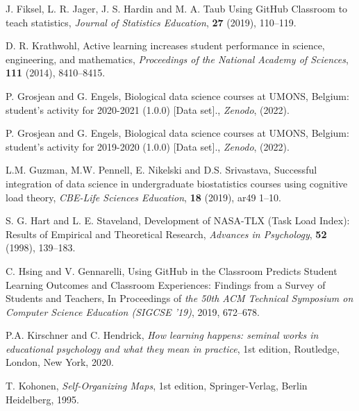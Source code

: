 \documentclass{aims} %
\theoremstyle{definition}
\begin{document}
\begin{thebibliography}{99}
     \newblock J. Fiksel, L. R. Jager, J. S. Hardin and M. A. Taub
     \newblock Using GitHub Classroom to teach statistics,
     \newblock \emph{Journal of Statistics Education}, \textbf{27} (2019), 110--119.

     \newblock  D. R. Krathwohl,
     \newblock Active learning increases student performance in science, engineering, and mathematics,
     \newblock \emph{Proceedings of the National Academy of Sciences}, \textbf{111} (2014), 8410--8415.

     \newblock P. Grosjean and G. Engels,
     \newblock Biological data science courses at UMONS, Belgium: student's activity for 2020-2021 (1.0.0) [Data set].,
     \newblock \emph{Zenodo}, (2022).

     \newblock P. Grosjean and G. Engels,
     \newblock Biological data science courses at UMONS, Belgium: student's activity for 2019-2020 (1.0.0) [Data set].,
     \newblock \emph{Zenodo}, (2022).

     \newblock L.M. Guzman, M.W. Pennell, E. Nikelski and D.S. Srivastava,
     \newblock Successful integration of data science in undergraduate biostatistics courses using cognitive load theory,
     \newblock \emph{CBE-Life Sciences Education}, \textbf{18} (2019), ar49 1--10.

     \newblock S. G. Hart and L. E. Staveland,
     \newblock Development of NASA-TLX (Task Load Index): Results of Empirical and Theoretical Research,
     \newblock \emph{Advances in Psychology}, \textbf{52} (1998), 139--183.

     \newblock C. Hsing and V. Gennarelli,
     \newblock Using GitHub in the Classroom Predicts Student Learning Outcomes and Classroom Experiences: Findings from a Survey of Students and Teachers,
     \newblock In Proceedings of \emph{the 50th ACM Technical Symposium on Computer Science Education (SIGCSE '19)}, 2019, 672–678.

     \newblock P.A. Kirschner and C. Hendrick,
     \newblock \emph{How learning happens: seminal works in educational psychology and what they mean in practice},
     \newblock 1st edition, Routledge, London, New York, 2020.

     \newblock T.  Kohonen,
     \newblock \emph{Self-Organizing Maps},
     \newblock 1st edition, Springer-Verlag, Berlin Heidelberg, 1995.


\end{thebibliography}
\end{document}
